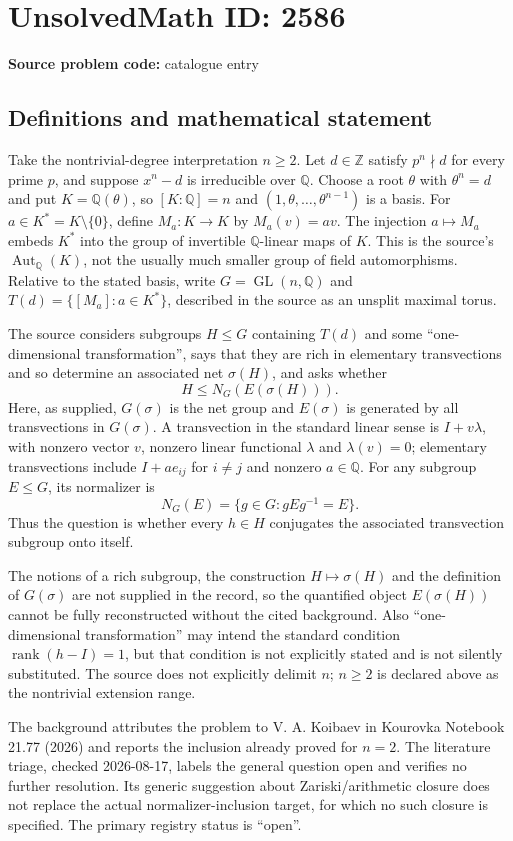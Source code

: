 \documentclass[11pt]{article}
\newcommand{\Z}{\mathbb{Z}}
\newcommand{\Q}{\mathbb{Q}}
\begin{document}
\section*{UnsolvedMath ID: 2586}
\textbf{Source problem code:} catalogue entry
\subsection{Definitions and mathematical statement}
Take the nontrivial-degree interpretation $n\geq2$. Let $d\in\Z$ satisfy $p^n\nmid d$ for every prime $p$, and suppose $x^n-d$ is irreducible over $\Q$. Choose a root $\theta$ with $\theta^n=d$ and put $K=\Q(\theta)$, so $[K:\Q]=n$ and $(1,\theta,\ldots,\theta^{n-1})$ is a basis. For $a\in K^*=K\setminus\{0\}$, define $M_a:K\to K$ by $M_a(v)=av$. The injection $a\mapsto M_a$ embeds $K^*$ into the group of invertible $\Q$-linear maps of $K$. This is the source's $\operatorname{Aut}_{\Q}(K)$, not the usually much smaller group of field automorphisms. Relative to the stated basis, write $G=\operatorname{GL}(n,\Q)$ and $T(d)=\{[M_a]:a\in K^*\}$, described in the source as an unsplit maximal torus.

The source considers subgroups $H\leq G$ containing $T(d)$ and some ``one-dimensional transformation'', says that they are rich in elementary transvections and so determine an associated net $\sigma(H)$, and asks whether
\[
H\leq N_G(E(\sigma(H))).
\]
Here, as supplied, $G(\sigma)$ is the net group and $E(\sigma)$ is generated by all transvections in $G(\sigma)$. A transvection in the standard linear sense is $I+v\lambda$, with nonzero vector $v$, nonzero linear functional $\lambda$ and $\lambda(v)=0$; elementary transvections include $I+a e_{ij}$ for $i\ne j$ and nonzero $a\in\Q$. For any subgroup $E\leq G$, its normalizer is
\[
N_G(E)=\{g\in G:gEg^{-1}=E\}.
\]
Thus the question is whether every $h\in H$ conjugates the associated transvection subgroup onto itself.

The notions of a rich subgroup, the construction $H\mapsto\sigma(H)$ and the definition of $G(\sigma)$ are not supplied in the record, so the quantified object $E(\sigma(H))$ cannot be fully reconstructed without the cited background. Also ``one-dimensional transformation'' may intend the standard condition $\operatorname{rank}(h-I)=1$, but that condition is not explicitly stated and is not silently substituted. The source does not explicitly delimit $n$; $n\geq2$ is declared above as the nontrivial extension range.

The background attributes the problem to V. A. Koibaev in Kourovka Notebook 21.77 (2026) and reports the inclusion already proved for $n=2$. The literature triage, checked 2026-08-17, labels the general question open and verifies no further resolution. Its generic suggestion about Zariski/arithmetic closure does not replace the actual normalizer-inclusion target, for which no such closure is specified. The primary registry status is ``open''.
\end{document}
